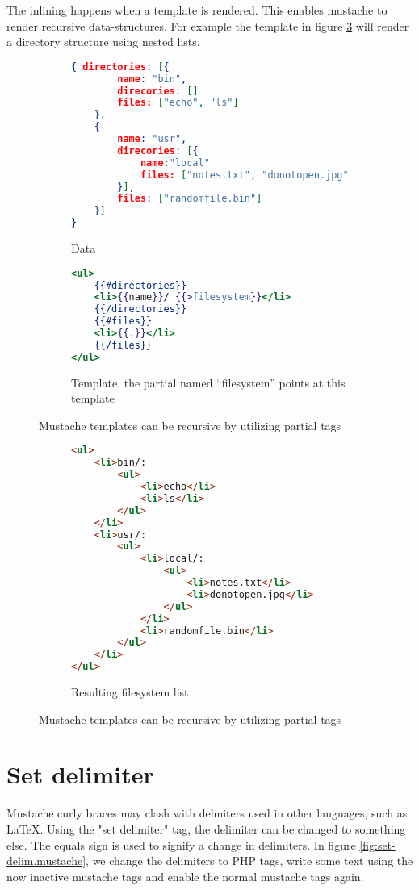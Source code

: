 \documentclass[thesis.tex]{subfiles}
\begin{document}
The inlining happens when a template is rendered. This enables mustache to
render recursive data-structures. For example the template in figure
\ref{fig:partial-example} will render a directory structure using nested lists.

\begin{figure}
	\centering
	\begin{subfigure}{\linewidth}
		\caption{Data}
		\label{fig:partial-example.data}
		\begin{lstlisting}[language=JSON]
{ directories: [{
		name: "bin",
		direcories: []
		files: ["echo", "ls"]
	},
	{
		name: "usr",
		direcories: [{
			name:"local"
			files: ["notes.txt", "donotopen.jpg"]
		}],
		files: ["randomfile.bin"]
	}]
}
		\end{lstlisting}
	\end{subfigure}
	
	\begin{subfigure}{\linewidth}
		\caption{Template, the partial named ``filesystem'' points at this template}
		\label{fig:partial-example.mustache}
		\begin{lstlisting}[language=mustache]
<ul>
	{{#directories}}
	<li>{{name}}/ {{>filesystem}}</li>
	{{/directories}}
	{{#files}}
	<li>{{.}}</li>
	{{/files}}
</ul>
		\end{lstlisting}
	\end{subfigure}
	\caption{Mustache templates can be recursive by utilizing partial tags}
	\label{fig:partial-example}
\end{figure}
	
\begin{figure}
	\ContinuedFloat
	\centering
	\begin{subfigure}{\linewidth}
		\caption{Resulting filesystem list}
		\label{fig:partial-example.html}
		\begin{lstlisting}[language=HTML]
<ul>
	<li>bin/:
		<ul>
			<li>echo</li>
			<li>ls</li>
		</ul>
	</li>
	<li>usr/:
		<ul>
			<li>local/:
				<ul>
					<li>notes.txt</li>
					<li>donotopen.jpg</li>
				</ul>
			</li>
			<li>randomfile.bin</li>
		</ul>
	</li>
</ul>
		\end{lstlisting}
	\end{subfigure}
	\caption{Mustache templates can be recursive by utilizing partial tags}
\end{figure}

\section{Set delimiter}
Mustache curly braces may clash with delmiters used in other languages,
such as LaTeX. Using the "set delimiter" tag, the delimiter can be changed to
something else. The equals sign is used to signify a change in delimiters.
In figure \ref{fig:set-delim.mustache}, we change the delimiters
to PHP tags, write some text using the now inactive mustache tags and enable the
normal mustache tags again.
\end{document}
